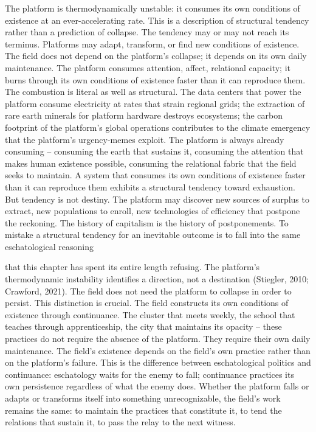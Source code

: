 The platform is thermodynamically unstable: it consumes its own conditions of existence at an ever-accelerating rate. This is a description of structural tendency rather than a prediction of collapse. The tendency may or may not reach its terminus. Platforms may adapt, transform, or find new conditions of existence. The field does not depend on the platform’s collapse; it depends on its own daily maintenance. The platform consumes attention, affect, relational capacity; it burns through its own conditions of existence faster than it can reproduce them. The combustion is literal as well as structural. The data centers that power the platform consume electricity at rates that strain regional grids; the extraction of rare earth minerals for platform hardware destroys ecosystems; the carbon footprint of the platform’s global operations contributes to the climate emergency that the platform’s urgency-memes exploit. The platform is always already consuming – consuming the earth that sustains it, consuming the attention that makes human existence possible, consuming the relational fabric that the field seeks to maintain. A system that consumes its own conditions of existence faster than it can reproduce them exhibits a structural tendency toward exhaustion. But tendency is not destiny. The platform may discover new sources of surplus to extract, new populations to enroll, new technologies of efficiency that postpone the reckoning. The history of capitalism is the history of postponements. To mistake a structural tendency for an inevitable outcome is to fall into the same eschatological reasoning

that this chapter has spent its entire length refusing. The platform’s thermodynamic instability identifies a direction, not a destination (Stiegler, 2010; Crawford, 2021). The field does not need the platform to collapse in order to persist. This distinction is crucial. The field constructs its own conditions of existence through continuance. The cluster that meets weekly, the school that teaches through apprenticeship, the city that maintains its opacity – these practices do not require the absence of the platform. They require their own daily maintenance. The field’s existence depends on the field’s own practice rather than on the platform’s failure. This is the difference between eschatological politics and continuance: eschatology waits for the enemy to fall; continuance practices its own persistence regardless of what the enemy does. Whether the platform falls or adapts or transforms itself into something unrecognizable, the field’s work remains the same: to maintain the practices that constitute it, to tend the relations that sustain it, to pass the relay to the next witness.

